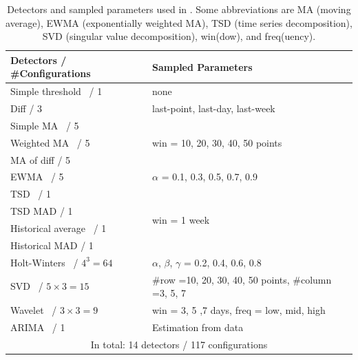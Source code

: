 \begin{table}[htp]
\caption{Detectors and sampled parameters used in \name. Some abbreviations are MA (moving average), EWMA (exponentially weighted MA), TSD (time series decomposition), SVD (singular value decomposition), win(dow), and freq(uency). }
\begin{center}
\begin{tabular}{|p{4cm}|p{4cm}|}
  \hline
Detectors  / \#Configurations&Sampled Parameters\\
\hline
\hline
 Simple threshold~\cite{cloudwatch} / 1&none\\
  \hline
 Diff / 3&last-point, last-day, last-week\\
 \hline
 Simple MA~\cite{Choffnes:2010:CSN:1851182.1851228} / 5 &\multirow{3}{105pt}{win = 10, 20, 30, 40, 50 points}\\
   \cline{1-1}
  Weighted MA~\cite{krishnamurthy2003sketch} / 5& \\
  \cline{1-1}
 MA of diff / 5& \\
 \hline
 EWMA~\cite{krishnamurthy2003sketch} / 5& $\alpha$ = 0.1, 0.3, 0.5, 0.7, 0.9\\
 \hline
 TSD~\cite{chen2013provider} / 1& \multirow{4}{105pt}{win = 1 week} \\
  \cline{1-1}
  TSD MAD / 1& \\
   \cline{1-1}
  Historical average~\cite{lee2012threshold} / 1&\\
  \cline{1-1}
  Historical MAD / 1& \\
 \hline
 Holt-Winters~\cite{yan2012argus} / $4^3=64$&
 $\alpha$, $\beta$, $\gamma$ = 0.2, 0.4, 0.6, 0.8\\
 \hline
 SVD~\cite{Mahimkar:2011:RDM:2079296.2079309} / $5\times3=15$&\#row =10, 20, 30, 40, 50 points, \#column =3, 5, 7\\
 \hline
  Wavelet~\cite{barford2002signal} / $3\times3=9$&win = 3, 5 ,7 days,\;\;\; freq = low, mid, high \\
 \hline
  ARIMA~\cite{Zhang:2005:NA:1251086.1251116} / 1&Estimation from data\\
 \hline
  \hline
  \multicolumn{2}{|c|}{In total: 14 detectors / 117 configurations}\\
  \hline

\end{tabular}
\end{center}
\label{tab:detector}
\vspace{-6 mm}
\end{table}

